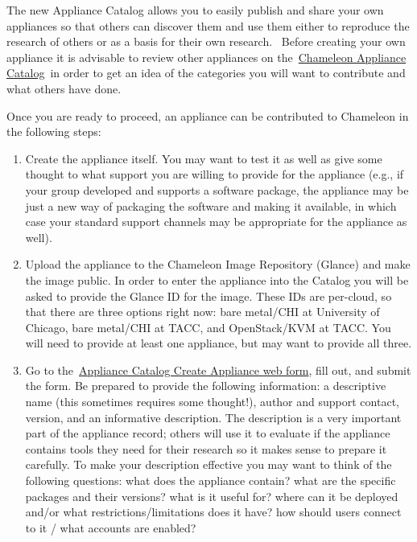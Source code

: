 The new Appliance Catalog allows you to easily publish and share your
own appliances so that others can discover them and use them either to
reproduce the research of others or as a basis for their own research.
~Before creating your own appliance it is advisable to review other
appliances on
the~\href{https://www.chameleoncloud.org/appliances/}{Chameleon
Appliance Catalog}~in order to get an idea of the categories you will
want to contribute and what others have done.~

Once you are ready to proceed, an appliance can be contributed to
Chameleon in the following steps:

\begin{enumerate}

\item
  Create the appliance itself. You may want to test it as well as give
  some thought to what support you are willing to provide for the
  appliance (e.g., if your group developed and supports a software
  package, the appliance may be just a new way of packaging the software
  and making it available, in which case your standard support channels
  may be appropriate for the appliance as well).
\item
  Upload the appliance to the Chameleon Image Repository (Glance) and
  make the image public. In order to enter the appliance into the
  Catalog you will be asked to provide the Glance ID for the image.
  These IDs are per-cloud, so that there are three options right now:
  bare metal/CHI at University of Chicago, bare metal/CHI at TACC, and
  OpenStack/KVM at TACC. You will need to provide at least one
  appliance, but may want to provide all three.
\item
  Go to
  the~\href{https://www.chameleoncloud.org/appliances/create/}{Appliance
  Catalog Create Appliance web form}, fill out, and submit the form. Be
  prepared to provide the following information: a descriptive name
  (this sometimes requires some thought!), author and support contact,
  version, and an informative description. The description is a very
  important part of the appliance record; others will use it to evaluate
  if the appliance contains tools they need for their research so it
  makes sense to prepare it carefully. To make your description
  effective you may want to think of the following questions: what does
  the appliance contain? what are the specific packages and their
  versions? what is it useful for? where can it be deployed and/or what
  restrictions/limitations does it have? how should users connect to it
  / what accounts are enabled?
\end{enumerate}

